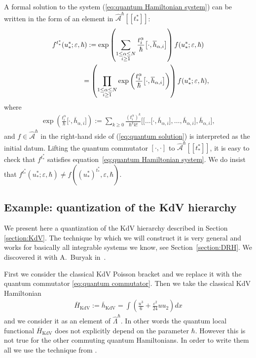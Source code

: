 \documentclass[pdftex]{sigma}
\numberwithin{equation}{section}
\newcommand{\oh}{\overline h}
\newcommand{\hLambda}{\widehat\Lambda}
\newcommand{\<}{\left<}
\renewcommand{\>}{\right>}
\newcommand{\eps}{\varepsilon}
\newcommand{\hcA}{\widehat{\mathcal A}}
\newcommand{\oH}{{\overline H}}
\begin{document}
A formal solution to the system (\ref{eq:quantum Hamiltonian system}) can be written in the form of an element in $\hcA^\hbar[[t^*_*]]$:
\begin{gather}
f^{t^*_*}(u^*_*;\eps,\hbar) := \exp\left(\sum_{\substack{1\leq\alpha\leq N\\ i\geq 1}} \frac{t^\alpha_i}{\hbar}\big[\cdot,\oh_{\alpha,i}\big]\right) f(u^*_*;\eps,\hbar)\nonumber\\
 \hphantom{f^{t^*_*}(u^*_*;\eps,\hbar)}{} = \left(\prod_{\substack{1\leq\alpha\leq N\\ i\geq 1}} \exp \left( \frac{t^\alpha_i}{\hbar}\big[\cdot,\oh_{\alpha,i}\big]\right) \right) f(u^*_*;\eps,\hbar),\label{eq:quantum solution} \end{gather}
where
\begin{gather*}
\exp\left(\frac{t^\alpha_i}{\hbar}\big[\cdot,\oh_{\alpha,i}\big]\right) := \sum_{k\geq 0} \frac{(t^\alpha_i)^k}{\hbar^k k!}\big[\big[\dots \big[\cdot,\oh_{\alpha,i}\big],\dots,\oh_{\alpha,i}\big],\oh_{\alpha,i}\big],
\end{gather*}
and $f\in \hcA^\hbar$ in the right-hand side of (\ref{eq:quantum solution}) is interpreted as the initial datum. Lifting the quantum commutator $[\cdot,\cdot]$ to $\hcA^\hbar[[t^*_*]]$, it is easy to check that $f^{t^*_*}$ satisf\/ies equation~\eqref{eq:quantum Hamiltonian system}. We do insist that $f^{t^*_*}(u^*_*;\eps,\hbar) \neq f((u^*_*)^{t^*_*},\eps,\hbar)$.

\subsection{Example: quantization of the KdV hierarchy}\label{section:qKdV}
We present here a quantization of the KdV hierarchy described in Section \ref{section:KdV}. The technique by which we will construct it is very general and works for basically all integrable systems we know, see Section~\ref{section:DRH}. We discovered it with A.~Buryak in~\cite{BR15}.

First we consider the classical KdV Poisson bracket and we replace it with the quantum commutator \eqref{eq:quantum commutator}. Then we take the classical KdV Hamiltonian
\begin{gather*}\oH_{\mathrm{KdV}} := \oh_{\mathrm{KdV}} = \int \left(\frac{u^3}{6} + \frac{\eps^2}{24} u u_{2}\right) dx\end{gather*}
and we consider it as an element of $\hLambda^\hbar$. In other words the quantum local functional $\oH_{\mathrm{KdV}}$ does not explicitly depend on the parameter $\hbar$. However this is not true for the other commuting quantum Hamiltonians. In order to write them all we use the technique from \cite{BR15}.
\end{document}

